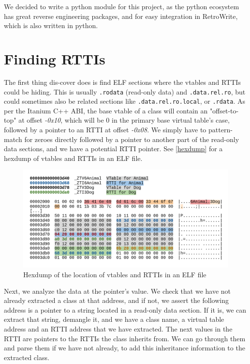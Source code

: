 \documentclass[a4paper,11pt,oneside]{report}
\newcommand{\lou}[1]{\todo[inline,color=green!40]{Louis: #1}}
\begin{document}
We decided to write a python module for this project, as the python ecosystem 
has great reverse engineering packages, and for easy integration in RetroWrite, 
which is also written in python.


\section{Finding RTTIs}

The first thing dis-cover does is find ELF sections where the vtables and RTTIs 
could be hiding.
This is usually \texttt{.rodata} (read-only data) and \texttt{.data.rel.ro}, 
but could sometimes also be related sections like \texttt{.data.rel.ro.local}, 
or \texttt{.rdata}.
As per the Itanium C++ ABI, the base vtable of a class will contain an 
"offset-to-top" at offset \emph{-0x10}, which will be 0 in the primary base 
virtual table's case, followed by a pointer to an RTTI at offset
\emph{-0x08}.
We simply have to pattern-match for zeroes directly followed by a pointer to 
another part of the read-only data sections, and we have a potential RTTI 
pointer. See \autoref{hexdump} for a hexdump of vtables and RTTIs in an ELF
file.

\lou{TODO label things as keys etc}

\begin{figure}

\includegraphics[width=16cm]{hexdump.png}
\caption{Hexdump of the location of vtables and RTTIs in an ELF file}
\label{hexdump}

\end{figure}

Next, we analyze the data at the pointer's value.
We check that we have not already extracted a class at that address, and if
not, we assert the following address is a pointer to a string located in a
read-only data section.
If it is, we can extract that string, demangle it, and we have a class name,
a virtual table address and an RTTI address that we have extracted.
The next values in the RTTI are pointers to the RTTIs the class inherits from.
We can go through them and parse them if we have not already, to add this 
inheritance information to the extracted class.
\end{document}
